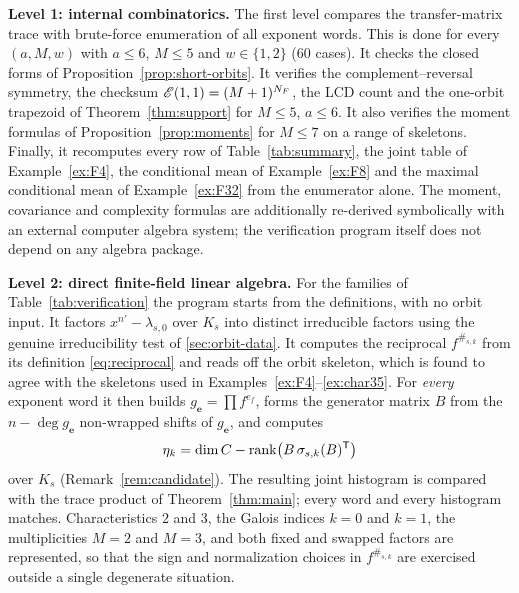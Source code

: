 \noindent\textbf{Level 1: internal combinatorics.}  The first level
compares the transfer-matrix trace with brute-force enumeration of all exponent
words. This is done for every $(a,M,w)$ with $a\leq6$, $M\leq5$ and
$w\in\{1,2\}$ (60 cases). It checks the closed forms of
Proposition~\ref{prop:short-orbits}. It verifies the complement--reversal
symmetry, the checksum $\mathscr E(1,1)=(M+1)^{N_F}$, the LCD count and the
one-orbit trapezoid of Theorem~\ref{thm:support} for $M\leq5$, $a\leq6$. It
also verifies the moment formulas of Proposition~\ref{prop:moments} for
$M\leq7$ on a range of skeletons. Finally, it recomputes every row of
Table~\ref{tab:summary}, the joint table of Example~\ref{ex:F4}, the
conditional mean of Example~\ref{ex:F8} and the maximal conditional mean of
Example~\ref{ex:F32} from the enumerator alone.
The moment, covariance and complexity formulas are additionally re-derived
symbolically with an external computer algebra system; the verification program
itself does not depend on any algebra package.

\noindent\textbf{Level 2: direct finite-field linear algebra.}  For the families of
Table~\ref{tab:verification} the program starts from the definitions, with no
orbit input. It factors $x^{n'}-\lambda_{s,0}$ over $K_s$ into distinct
irreducible factors using the genuine irreducibility test of
\ref{sec:orbit-data}. It computes the reciprocal $f^{\#_{s,k}}$ from its
definition \eqref{eq:reciprocal} and reads off the orbit skeleton, which is
found to agree with the skeletons used in
Examples~\ref{ex:F4}--\ref{ex:char35}. For \emph{every} exponent word it then
builds $g_{\mathbf{e}}=\prod f^{e_f}$, forms the generator matrix $B$ from the
$n-\deg g_{\mathbf{e}}$ non-wrapped shifts of $g_{\mathbf{e}}$, and computes
\[
\eta_k=\dim C-\operatorname{rank}\bigl(B\,\sigma_{s,k}(B)^{\mathsf T}\bigr)
\]
over $K_s$ (Remark~\ref{rem:candidate}).  The resulting joint histogram is
compared with the trace product of Theorem~\ref{thm:main}; every word and every
histogram matches.  Characteristics $2$ and $3$, the Galois indices $k=0$ and
$k=1$, the multiplicities $M=2$ and $M=3$, and both fixed and swapped factors
are represented, so that the sign and normalization choices in $f^{\#_{s,k}}$
are exercised outside a single degenerate situation.

